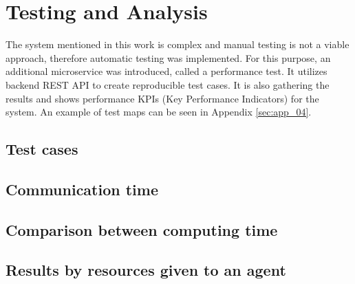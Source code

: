 \chapter{Testing and Analysis}
The system mentioned in this work is complex and manual testing is not a viable approach, therefore automatic testing was implemented. For this purpose, an additional microservice was introduced, called a performance test. It utilizes backend REST API to create reproducible test cases. It is also gathering the results and shows performance KPIs (Key Performance Indicators) for the system. An example of test maps can be seen in Appendix \ref{sec:app_04}.

\section{Test cases}


\section{Communication time}


\section{Comparison between computing time}


\section{Results by resources given to an agent}



